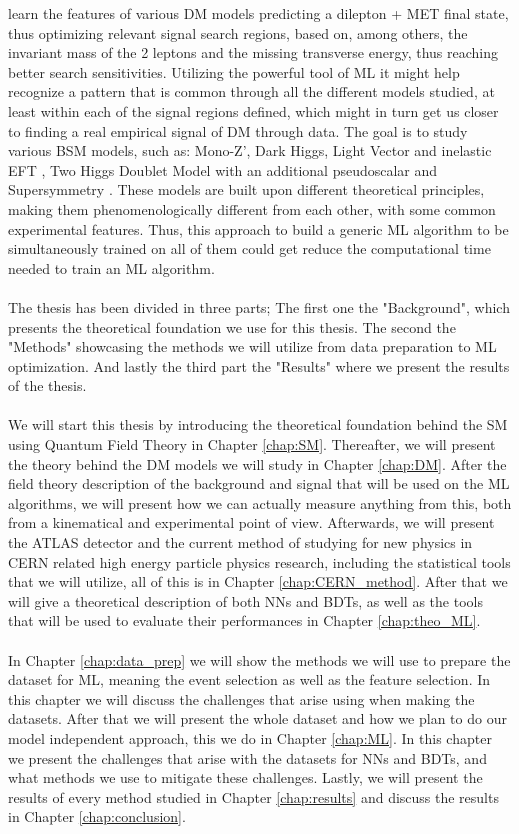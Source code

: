 \documentclass[12pt, a4paper]{book}
\begin{document}
learn the features of various DM models predicting a dilepton + MET final state, thus optimizing relevant signal search regions, based on, among others, the invariant mass of the 2 leptons and the missing transverse energy, thus reaching better search sensitivities. 
Utilizing the powerful tool of ML it might help recognize a pattern that is common through all the different models studied, at least within each of the signal regions defined, which might in turn get us closer to finding a real empirical signal of DM through data. 
The goal is to study various BSM models, such as: Mono-Z', Dark Higgs, Light Vector and inelastic EFT \cite{Zp_DM_candidate2}, Two Higgs Doublet Model with an additional pseudoscalar \cite{article} and Supersymmetry \cite{JUNGMAN1996195}. 
These models are built upon different theoretical principles, making them phenomenologically different from each other, with some common experimental features. Thus, this approach to build a generic ML algorithm to be simultaneously trained on all of them 
could get reduce the computational time needed to train an ML algorithm.\\
\\The thesis has been divided in three parts; The first one the "Background", which presents the theoretical foundation we use for this thesis. The second the "Methods" showcasing the methods we will utilize from data preparation to ML optimization. And lastly the third part the "Results" 
where we present the results of the thesis. \\
\\We will start this thesis by introducing the theoretical foundation behind the SM using Quantum Field Theory in Chapter \ref{chap:SM}. Thereafter, we will present the theory behind the DM models we will study in Chapter \ref{chap:DM}. After the field theory description of the background and signal that will be used 
on the ML algorithms, we will present how we can actually measure anything from this, both from a kinematical and experimental point of view. Afterwards, we will present the ATLAS detector and the current method of studying for new physics in CERN related high energy particle physics research, including the statistical 
tools that we will utilize, all of this is in Chapter \ref{chap:CERN_method}. After that we will give a theoretical description of both NNs and BDTs, as well as the tools that will be used to evaluate their performances in Chapter \ref{chap:theo_ML}.\\
\\In Chapter \ref{chap:data_prep} we will show the methods we will use to prepare the dataset for ML, meaning the event selection as well as the feature selection. In this chapter we will discuss the challenges that arise using when making the datasets. After that we will present the whole dataset and 
how we plan to do our model independent approach, this we do in Chapter \ref{chap:ML}. In this chapter we present the challenges that arise with the datasets for NNs and BDTs, and what methods we use to mitigate these challenges. Lastly, we will present the results of every method studied in Chapter \ref{chap:results} 
and discuss the results in Chapter \ref{chap:conclusion}.
\end{document}
